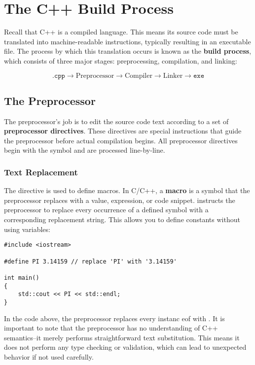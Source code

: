 \documentclass[12pt]{article}
\begin{document}
\section{The C++ Build Process}

\noindent
Recall that C++ is a compiled language.
This means its source code must be translated into machine-readable instructions, typically resulting in an executable file.
The process by which this translation occurs is known as the \textbf{build process}, which consists of three major stages: preprocessing, compilation, and linking:

\[\texttt{.cpp} \rightarrow \boxed{\textrm{Preprocessor}} \rightarrow \boxed{\textrm{Compiler}} \rightarrow \boxed{\textrm{Linker}} \rightarrow \texttt{exe}\]

\subsection{The Preprocessor}

\noindent
The preprocessor's job is to edit the source code text according to a set of \textbf{preprocessor directives}.
These directives are special instructions that guide the preprocessor before actual compilation begins.
All preprocessor directives begin with the \inlinecxx{#} symbol and are processed line-by-line.

\subsubsection{Text Replacement }

\noindent
The  directive is used to define macros.
In C/C++, a \textbf{macro} is a symbol that the preprocessor replaces with a value, expression, or code snippet.
 instructs the preprocessor to replace every occurrence of a defined symbol with a corresponding replacement string.
This allows you to define constants without using variables:

\begin{lstlisting}[style=cxx]
#include <iostream>

#define PI 3.14159 // replace 'PI' with '3.14159'

int main()
{
    std::cout << PI << std::endl;
}
\end{lstlisting}

\noindent
In the code above, the preprocessor replaces every instanc eof  with .
It is important to note that the preprocessor has no understanding of C++ semantics--it merely performs straightforward text substitution.
This means it does not perform any type checking or validation, which can lead to unexpected behavior if not used carefully.
\end{document}
